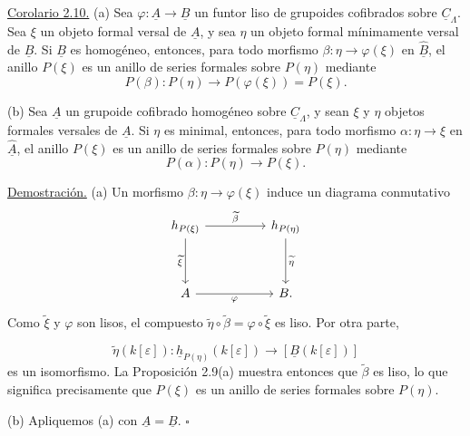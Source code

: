 \par\medskip\noindent
\underline{Corolario 2.10.} (a) Sea
$\varphi:\underline A\longrightarrow\underline B$ un funtor liso de
grupoides cofibrados sobre $\underline C_\Lambda$. Sea $\xi$ un objeto
formal versal de $\underline A$, y sea $\eta$ un objeto formal
mínimamente versal de $\underline B$. Si $\underline B$ es homogéneo,
entonces, para todo morfismo
$\beta:\eta\longrightarrow\varphi(\xi)$ en
$\widehat{\underline B}$, el anillo $P(\xi)$ es un anillo de series
formales sobre $P(\eta)$ mediante
\[
 P(\beta):P(\eta)\longrightarrow P(\varphi(\xi))=P(\xi).
\]

(b) Sea $\underline A$ un grupoide cofibrado homogéneo sobre
$\underline C_\Lambda$, y sean $\xi$ y $\eta$ objetos formales versales
de $\underline A$. Si $\eta$ es minimal, entonces, para todo morfismo
$\alpha:\eta\longrightarrow\xi$ en $\widehat{\underline A}$, el
anillo $P(\xi)$ es un anillo de series formales sobre $P(\eta)$ mediante
\[
 P(\alpha):P(\eta)\longrightarrow P(\xi).
\]

\underline{Demostración.} (a) Un morfismo
$\beta:\eta\longrightarrow\varphi(\xi)$ induce un diagrama conmutativo
\[
\begin{tikzcd}[row sep=huge,column sep=huge]
 \underline h_{P(\xi)} \arrow[r,"{\widetilde\beta}"]
                           \arrow[d,"{\widetilde\xi}"']
 & \underline h_{P(\eta)} \arrow[d,"{\widetilde\eta}"]\\
 \underline A \arrow[r,"{\varphi}"'] & \underline B.
\end{tikzcd}
\]
Como $\widetilde\xi$ y $\varphi$ son lisos, el compuesto
$\widetilde\eta\circ\widetilde\beta
=\varphi\circ\widetilde\xi$ es liso. Por otra parte,


\[
 \widetilde\eta(k[\varepsilon]):
 \underline h_{P(\eta)}(k[\varepsilon])
 \longrightarrow[\underline B(k[\varepsilon])]
\]
es un isomorfismo. La Proposición 2.9(a) muestra entonces que
$\widetilde\beta$ es liso, lo que significa precisamente que $P(\xi)$
es un anillo de series formales sobre $P(\eta)$.

(b) Apliquemos (a) con $\underline A=\underline B$.
\hfill$\square$

